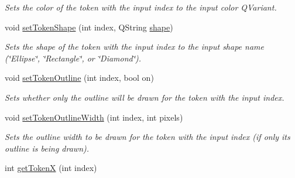 \begin{DoxyCompactItemize}
\begin{DoxyCompactList}\small\item\em Sets the color of the token with the input index to the input color Q\-Variant. \end{DoxyCompactList}\item 
\hypertarget{class_picto_1_1_token_tray_graphic_a85db195da8201a4b8afd1c173f041fab}{void \hyperlink{class_picto_1_1_token_tray_graphic_a85db195da8201a4b8afd1c173f041fab}{set\-Token\-Shape} (int index, Q\-String \hyperlink{class_picto_1_1_token_tray_graphic_a8635ae2a3b7939007fae31ea013ae06b}{shape})}\label{class_picto_1_1_token_tray_graphic_a85db195da8201a4b8afd1c173f041fab}

\begin{DoxyCompactList}\small\item\em Sets the shape of the token with the input index to the input shape name (\char`\"{}\-Ellipse\char`\"{}, \char`\"{}\-Rectangle\char`\"{}, or \char`\"{}\-Diamond\char`\"{}). \end{DoxyCompactList}\item 
\hypertarget{class_picto_1_1_token_tray_graphic_a99b2644f84a6d6712028c423169bf3e1}{void \hyperlink{class_picto_1_1_token_tray_graphic_a99b2644f84a6d6712028c423169bf3e1}{set\-Token\-Outline} (int index, bool on)}\label{class_picto_1_1_token_tray_graphic_a99b2644f84a6d6712028c423169bf3e1}

\begin{DoxyCompactList}\small\item\em Sets whether only the outline will be drawn for the token with the input index. \end{DoxyCompactList}\item 
\hypertarget{class_picto_1_1_token_tray_graphic_a68a7e9c2328e9100743e2c9d14162267}{void \hyperlink{class_picto_1_1_token_tray_graphic_a68a7e9c2328e9100743e2c9d14162267}{set\-Token\-Outline\-Width} (int index, int pixels)}\label{class_picto_1_1_token_tray_graphic_a68a7e9c2328e9100743e2c9d14162267}

\begin{DoxyCompactList}\small\item\em Sets the outline width to be drawn for the token with the input index (if only its outline is being drawn). \end{DoxyCompactList}\item 
\hypertarget{class_picto_1_1_token_tray_graphic_aad95d0437564ef4355fed41c29bcf712}{int \hyperlink{class_picto_1_1_token_tray_graphic_aad95d0437564ef4355fed41c29bcf712}{get\-Token\-X} (int index)}\label{class_picto_1_1_token_tray_graphic_aad95d0437564ef4355fed41c29bcf712}


\end{DoxyCompactItemize}
